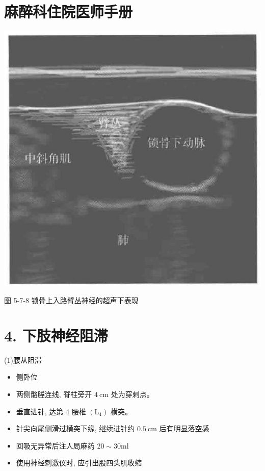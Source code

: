 \documentclass[10pt]{article}
\begin{document}
\section*{麻醉科住院医师手册}
\begin{center}
\includegraphics[max width=\textwidth]{2024_07_05_645bb794a4d4f32ee0c8g-322}
\end{center}

图 5-7-8 锁骨上入路臂丛神经的超声下表现

\section*{4. 下肢神经阻滞}
(1)腰从阻滞

\begin{itemize}
  \item 侧卧位
  \item 两侧骼塍连线, 脊柱旁开 $4 \mathrm{~cm}$ 处为穿刺点。
  \item 垂直进针, 达第 4 腰椎 $\left(\mathrm{L}_{4}\right)$ 横突。
  \item 针尖向尾侧滑过横突下缘, 继续进针约 $0.5 \mathrm{~cm}$ 后有明显落空感
  \item 回吸无异常后注人局麻药 $20 \sim 30 \mathrm{ml}$
  \item 使用神经刺激仪时, 应引出股四头肌收缩
\end{itemize}
\end{document}
